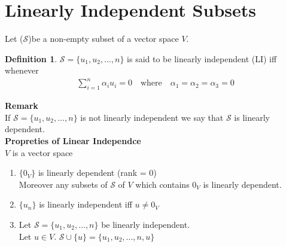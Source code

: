 \documentclass[
12pt,
]{article}
\newcommand{\un}{u_1 , u_2 , \dots , n}
\newcommand{\sSt}{($\mathcal{S}$)}
\theoremstyle{definition}
\theoremstyle{definition}
\theoremstyle{definition}
\newtheorem{Definition}{Definition}[section]
\theoremstyle{definition}
\begin{document}
\section{Linearly Independent Subsets}
Let \sSt be a non-empty subset of a vector space $V$. \\
\begin{Definition}
	$\mathcal{S} = \{\un\}$ is said to be linearly independent (LI) iff whenever 
	\begin{gather*}
		\sum_{i = 1}^{n} \alpha_i u_i = 0 \quad \text{where} \quad \alpha_1 = \alpha_2 = \alpha_3 =0
	\end{gather*}
\end{Definition}
\textbf{Remark} \\
If $\mathcal{S} = \{\un\}$ is not linearly independent we say that $\mathcal{S}$ is linearly dependent. \\
\textbf{Propreties of Linear Independce} \\
$V$ is a vector space 
\begin{enumerate}
	\item $\{0_V\}$ is linearly dependent (rank = 0) \\
	Moreover any subsets of $\mathcal{S}$ of $V$ which contains $0_V$ is linearly dependent. 
	\item $\{u_n\}$ is linearly independent iff $ u\neq 0_V$ 
	\item Let $\mathcal{S} = \{\un\}$ be linearly independent. \\
	Let $u \in V$. $\mathcal{S} \cup \{u\} = \{\un , u\}$
\end{enumerate}
\end{document}
